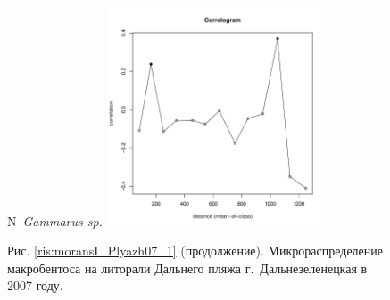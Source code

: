 \documentclass[12pt, a4paper]{disser}
\begin{document}
\begin{figure}[h]
	\begin{minipage}[b]{.46\linewidth}
	\begin{center}
	{\small N~{\it Gammarus sp.}}
		\includegraphics[width=65mm]{../Barenc_Sea/distribution_Moran/Plyazh07_moran_N_Gammarus_sp_.pdf}
	\end{center}
	\end{minipage}
%
%



	\begin{center}
	Рис. \ref{ris:moransI_Plyazh07_1} (продолжение). Микрораспределение макробентоса на литорали Дальнего пляжа г.~Дальнезеленецкая в 2007 году.
	\end{center}

\end{figure}
\end{document}
